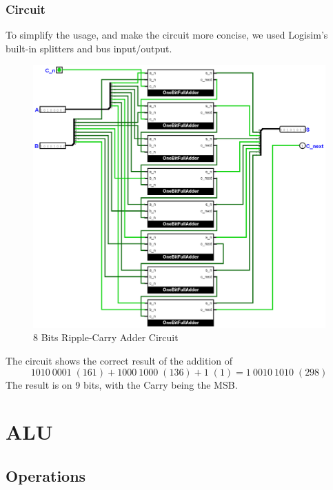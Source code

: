 \documentclass{article}
\begin{document}
\subsubsection{Circuit}
To simplify the usage, and make the circuit more concise, we used Logisim's built-in splitters and bus input/output.

\begin{figure}[H]
    \centering
    \includegraphics[width=\textwidth]{circuits/EightBitAdder.png}
    \caption{8 Bits Ripple-Carry Adder Circuit}
\end{figure}

The circuit shows the correct result of the addition of
$$
1010\:0001\;(161) + 1000\:1000\;(136) + 1\;(1) = 1\:0010\:1010\;(298)
$$
The result is on 9 bits, with the Carry being the MSB.

\section{ALU}

\subsection{Operations}
\end{document}
